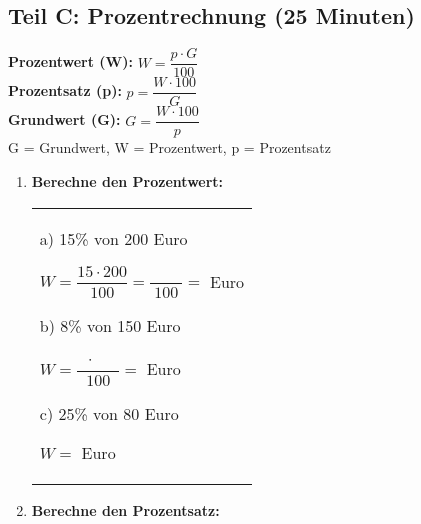 \subsection*{Teil C: Prozentrechnung (25 Minuten)}

\begin{merkbox}[Prozentformeln]
    \textbf{Prozentwert (W):} $W = \dfrac{p \cdot G}{100}$ \\
    \textbf{Prozentsatz (p):} $p = \dfrac{W \cdot 100}{G}$ \\  
    \textbf{Grundwert (G):} $G = \dfrac{W \cdot 100}{p}$ \\
    G = Grundwert, W = Prozentwert, p = Prozentsatz
\end{merkbox}

\begin{enumerate}[label=\arabic*., resume]

    \item \textbf{Berechne den Prozentwert:}

    \vspace{0.5cm}

    \begin{tabular}{l}
        a) 15\% von 200 Euro

        \vspace{0.3cm}
        $W = \dfrac{15 \cdot 200}{100} = \dfrac{\phantom{0000}}{100} = $ \underline{\hspace{2cm}} Euro

        \vspace{0.5cm}

        b) 8\% von 150 Euro

        \vspace{0.3cm}
        $W = \dfrac{\phantom{0} \cdot \phantom{000}}{100} = $ \underline{\hspace{2cm}} Euro

        \vspace{0.5cm}

        c) 25\% von 80 Euro

        \vspace{0.3cm}
        $W = $ \underline{\hspace{4cm}} Euro
    \end{tabular}

    \vspace{1cm}

    \item \textbf{Berechne den Prozentsatz:}

    \vspace{0.5cm}


\end{enumerate}
